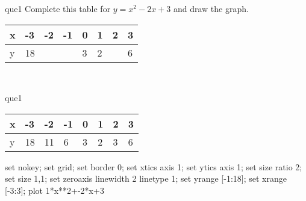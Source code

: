 \documentclass[13.5pt, varwidth=true]{beamer}
\begin{document}
\begin{frame}[shrink=19,fragile]
	\begin{beamercolorbox}[rounded=true, left, shadow=true,wd=14.8cm]{que1}
		 Complete this table for $y = x^{2} - 2x + 3$ and draw the graph. \\[0.3cm] \renewcommand{\arraystretch}{1.2}\begin{tabular}{|C|C|C|C|C|C|C|C|} \hline x & -3 & -2 & -1 & 0 & 1 & 2 & 3 \\ \hline y & 18 &  &  & 3 & 2 &  & 6\\ \hline \end{tabular}\\[0.3cm]
	\end{beamercolorbox}
\end{frame}
\begin{frame}[shrink=19,fragile]
	\begin{beamercolorbox}[rounded=true, left, shadow=true,wd=14.8cm]{que1}
		\renewcommand{\arraystretch}{1.2}\begin{tabular}{|C|C|C|C|C|C|C|C|} \hline x & -3 & -2 & -1 & 0 & 1 & 2 & 3 \\ \hline y & 18 & 11 & 6 & 3 & 2 & 3 & 6\\ \hline \end{tabular}\begin{gnuplot}[terminal=pdf] set nokey; set grid; set border 0; set xtics axis 1; set ytics axis 1; set size ratio 2; set size 1,1; set zeroaxis linewidth 2 linetype 1; set yrange [-1:18]; set xrange [-3:3]; plot 1*x**2+-2*x+3 \end{gnuplot}
	\end{beamercolorbox}
\end{frame}
\end{document}
